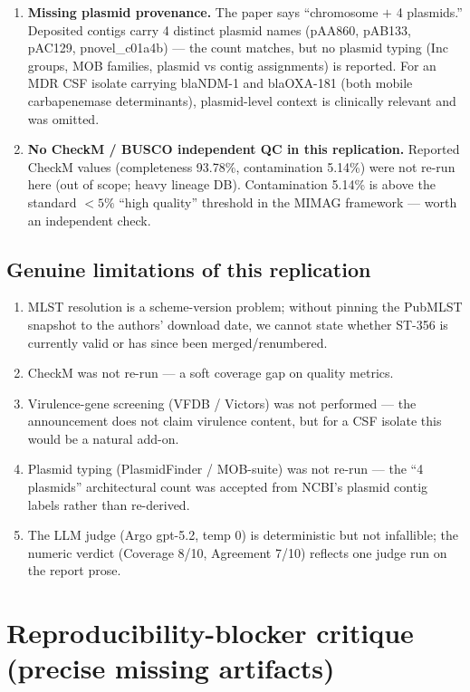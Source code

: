 \documentclass[11pt]{article}
\begin{document}
\begin{enumerate}
  \item \textbf{Missing plasmid provenance.} The paper says ``chromosome $+$ 4 plasmids.'' Deposited
  contigs carry 4 distinct plasmid names (pAA860, pAB133, pAC129, pnovel\_c01a4b) --- the count
  matches, but no plasmid typing (Inc groups, MOB families, plasmid vs contig assignments) is
  reported. For an MDR CSF isolate carrying blaNDM-1 and blaOXA-181 (both mobile carbapenemase
  determinants), plasmid-level context is clinically relevant and was omitted.

  \item \textbf{No CheckM / BUSCO independent QC in this replication.} Reported CheckM values
  (completeness 93.78\%, contamination 5.14\%) were not re-run here (out of scope; heavy lineage
  DB). Contamination 5.14\% is above the standard $<5\%$ ``high quality'' threshold in the MIMAG
  framework --- worth an independent check.
\end{enumerate}

\subsection{Genuine limitations of this replication}

\begin{enumerate}
  \item MLST resolution is a scheme-version problem; without pinning the PubMLST snapshot to the
  authors' download date, we cannot state whether ST-356 is currently valid or has since been
  merged/renumbered.
  \item CheckM was not re-run --- a soft coverage gap on quality metrics.
  \item Virulence-gene screening (VFDB / Victors) was not performed --- the announcement does not
  claim virulence content, but for a CSF isolate this would be a natural add-on.
  \item Plasmid typing (PlasmidFinder / MOB-suite) was not re-run --- the ``4 plasmids'' architectural
  count was accepted from NCBI's plasmid contig labels rather than re-derived.
  \item The LLM judge (Argo gpt-5.2, temp 0) is deterministic but not infallible; the numeric
  verdict (Coverage 8/10, Agreement 7/10) reflects one judge run on the report prose.
\end{enumerate}

\section{Reproducibility-blocker critique (precise missing artifacts)}
\end{document}
